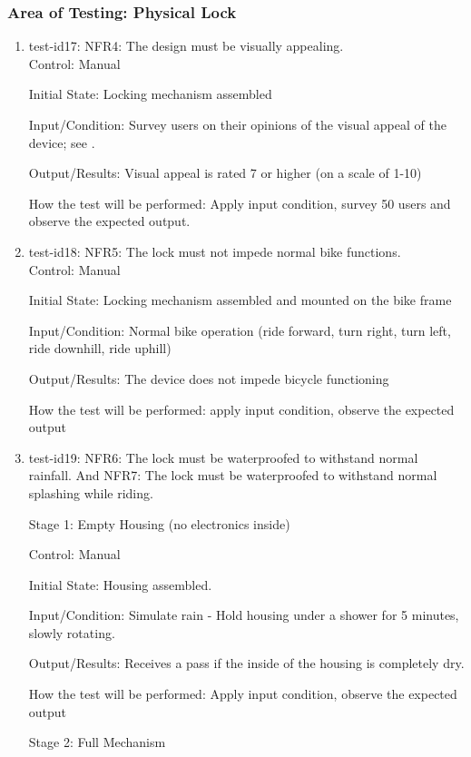 \documentclass[12pt, titlepage]{article}
\begin{document}
\subsubsection{Area of Testing: Physical Lock}
\begin{enumerate}

\item{test-id17: NFR4: The design must be visually appealing. \\}
Control: Manual 

Initial State: Locking mechanism assembled 

Input/Condition: Survey users on their opinions of the visual appeal of the device; see .

Output/Results: Visual appeal is rated 7 or higher (on a scale of 1-10) 

How the test will be performed: Apply input condition, survey 50 users and observe the expected output.

\item{test-id18: NFR5: The lock must not impede normal bike functions. \\}
Control: Manual 

Initial State: Locking mechanism assembled and mounted on the bike frame 

Input/Condition: Normal bike operation (ride forward, turn right, turn left, ride downhill, ride uphill) 

Output/Results: The device does not impede bicycle functioning 

How the test will be performed: apply input condition, observe the expected output

\item{test-id19: NFR6: The lock must be waterproofed to withstand normal rainfall. And NFR7:  The lock must be waterproofed to withstand normal splashing while riding. \\}

Stage 1: Empty Housing (no electronics inside) 

Control: Manual 

Initial State: Housing assembled.

Input/Condition: Simulate rain - Hold housing under a shower for 5 minutes, slowly rotating.

Output/Results: Receives a pass if the inside of the housing is completely dry.

How the test will be performed: Apply input condition, observe the expected output

Stage 2: Full Mechanism 


\end{enumerate}
\end{document}
